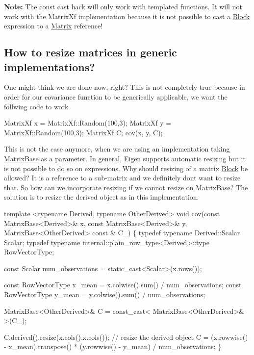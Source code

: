 {\bfseries Note\+:} The const cast hack will only work with templated functions. It will not work with the Matrix\+Xf implementation because it is not possible to cast a \hyperlink{group___core___module_class_eigen_1_1_block}{Block} expression to a \hyperlink{group___core___module_class_eigen_1_1_matrix}{Matrix} reference!\hypertarget{_topic_function_taking_eigen_types_TopicResizingInGenericImplementations}{}\subsection{How to resize matrices in generic implementations?}\label{_topic_function_taking_eigen_types_TopicResizingInGenericImplementations}
One might think we are done now, right? This is not completely true because in order for our covariance function to be generically applicable, we want the follwing code to work 
\begin{DoxyCode}
MatrixXf x = MatrixXf::Random(100,3);
MatrixXf y = MatrixXf::Random(100,3);
MatrixXf C;
cov(x, y, C);
\end{DoxyCode}
 This is not the case anymore, when we are using an implementation taking \hyperlink{group___core___module_class_eigen_1_1_matrix_base}{Matrix\+Base} as a parameter. In general, Eigen supports automatic resizing but it is not possible to do so on expressions. Why should resizing of a matrix \hyperlink{group___core___module_class_eigen_1_1_block}{Block} be allowed? It is a reference to a sub-\/matrix and we definitely don\textquotesingle{}t want to resize that. So how can we incorporate resizing if we cannot resize on \hyperlink{group___core___module_class_eigen_1_1_matrix_base}{Matrix\+Base}? The solution is to resize the derived object as in this implementation. 
\begin{DoxyCode}
\textcolor{keyword}{template} <\textcolor{keyword}{typename} Derived, \textcolor{keyword}{typename} OtherDerived>
\textcolor{keywordtype}{void} cov(\textcolor{keyword}{const} MatrixBase<Derived>& x, \textcolor{keyword}{const} MatrixBase<Derived>& y, MatrixBase<OtherDerived> \textcolor{keyword}{const} & C\_)
\{
  \textcolor{keyword}{typedef} \textcolor{keyword}{typename} Derived::Scalar Scalar;
  \textcolor{keyword}{typedef} \textcolor{keyword}{typename} internal::plain\_row\_type<Derived>::type RowVectorType;

  \textcolor{keyword}{const} Scalar num\_observations = \textcolor{keyword}{static\_cast<}Scalar\textcolor{keyword}{>}(x.rows());

  \textcolor{keyword}{const} RowVectorType x\_mean = x.colwise().sum() / num\_observations;
  \textcolor{keyword}{const} RowVectorType y\_mean = y.colwise().sum() / num\_observations;

  MatrixBase<OtherDerived>& C = \textcolor{keyword}{const\_cast<} MatrixBase<OtherDerived>& \textcolor{keyword}{>}(C\_);
  
  C.derived().resize(x.cols(),x.cols()); \textcolor{comment}{// resize the derived object}
  C = (x.rowwise() - x\_mean).transpose() * (y.rowwise() - y\_mean) / num\_observations;
\}
\end{DoxyCode}

